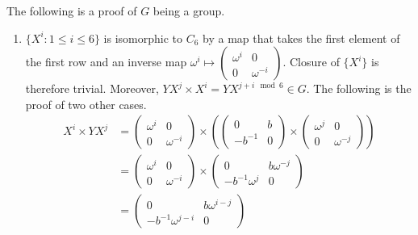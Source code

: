 \begin{solution}
    The following is a proof of \(G\) being a group.
    \begin{enumerate}
        \item \(\{X^i : 1 \leq i \leq 6\}\) is isomorphic to \(C_6\) by a map that takes the first element of the first row and an inverse map \(\omega^i \mapsto \begin{pmatrix} \omega^i & 0 \\ 0 & \omega^{ - i} \end{pmatrix}\). Closure of \(\{X^i\}\) is therefore trivial. Moreover, \(YX^j \times X^i = YX^{j + i \mod 6} \in G\). The following is the proof of two other cases.
              \begin{align*}
                  X^i \times YX^j & =
                  \begin{pmatrix}
                      \omega^i & 0             \\
                      0        & \omega^{ - i}
                  \end{pmatrix} \times \left(\begin{pmatrix}
                          0         & b \\
                          -b^{ - 1} & 0
                      \end{pmatrix} \times \begin{pmatrix}
                          \omega^j & 0             \\
                          0        & \omega^{ - j}
                      \end{pmatrix}\right) \\
                                  & =
                  \begin{pmatrix}
                      \omega^i & 0             \\
                      0        & \omega^{ - i}
                  \end{pmatrix} \times \begin{pmatrix}
                      0                   & b\omega^{ - j} \\
                      - b^{ - 1} \omega^j & 0
                  \end{pmatrix}                                                \\
                                  & =
                  \begin{pmatrix}
                      0                         & b\omega^{i - j} \\
                      - b^{ - 1} \omega^{j - i} & 0

\end{pmatrix}
\end{align*}
\end{enumerate}
\end{solution}
